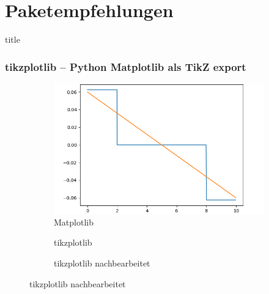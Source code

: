 \documentclass[aspectratio=169, 10pt]{beamer}
\makeatletter
\newcommand\sectiontitlepage{
    \miniframesoff
    \begin{frame}
        \vfill
        \centering
        \begin{beamercolorbox}[sep=8pt,center,shadow=true,rounded=true]{title}
            \usebeamerfont{title}\insertsectionhead\par%
        \end{beamercolorbox}
        \vfill
    \end{frame}
    \miniframeson
}
\let\beamer@writeslidentry@miniframeson=\beamer@writeslidentry
\def\beamer@writeslidentry@miniframesoff{%
    \expandafter\beamer@ifempty\expandafter{\beamer@framestartpage}{}%
    {%
        \clearpage\beamer@notesactions%
    }
}
\newcommand*{\miniframeson}{\let\beamer@writeslidentry=\beamer@writeslidentry@miniframeson}
\newcommand*{\miniframesoff}{\let\beamer@writeslidentry=\beamer@writeslidentry@miniframesoff}
\makeatother
\begin{document}
\section{Paketempfehlungen}

\sectiontitlepage

\begin{frame}[fragile]
    \frametitle{tikzplotlib -- Python Matplotlib als TikZ export}%
    \vspace*{-1ex}
    \begin{figure}
        \begin{subfigure}{0.5\textwidth}
            \centering
        \end{subfigure}%
        \begin{subfigure}{0.5\textwidth}
            \centering
            \includegraphics[width=.7\linewidth]{images/tikzplotlib/tpl-example-crop}
            \caption{Matplotlib}
        \end{subfigure}%

        \vspace*{-4ex}%

        \begin{subfigure}{0.5\textwidth}
            
            \caption{tikzplotlib}
        \end{subfigure}%
        \begin{subfigure}{0.5\textwidth}
            \raisebox{0.65ex}{}
            \caption{tikzplotlib nachbearbeitet}
        \end{subfigure}%
    \end{figure}
\end{frame}
\end{document}
